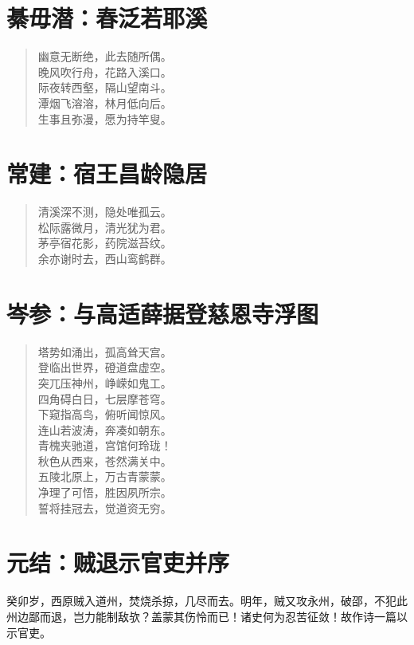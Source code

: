 \documentclass[12pt,oneside]{book}
\newenvironment{shici}{
\begin{verse}
\centering\large\hspace{12pt}}
{\end{verse}}
\begin{document}
\chapter{綦毋潜：春泛若耶溪}
\begin{shici}
幽意无断绝，此去随所偶。\\
晚风吹行舟，花路入溪口。\\
际夜转西壑，隔山望南斗。\\
潭烟飞溶溶，林月低向后。\\
生事且弥漫，愿为持竿叟。
\end{shici}

\chapter{常建：宿王昌龄隐居}
\begin{shici}
清溪深不测，隐处唯孤云。\\
松际露微月，清光犹为君。\\
茅亭宿花影，药院滋苔纹。\\
余亦谢时去，西山鸾鹤群。
\end{shici}

\chapter{岑参：与高适薛据登慈恩寺浮图}
\begin{shici}
塔势如涌出，孤高耸天宫。\\
登临出世界，磴道盘虚空。\\
突兀压神州，峥嵘如鬼工。\\
四角碍白日，七层摩苍穹。\\
下窥指高鸟，俯听闻惊风。\\
连山若波涛，奔凑如朝东。\\
青槐夹驰道，宫馆何玲珑！\\
秋色从西来，苍然满关中。\\
五陵北原上，万古青蒙蒙。\\
净理了可悟，胜因夙所宗。\\
誓将挂冠去，觉道资无穷。
\end{shici}

\chapter{元结：贼退示官吏并序}
癸卯岁，西原贼入道州，焚烧杀掠，几尽而去。明年，贼又攻永州，破邵，不犯此州边鄙而退，岂力能制敌欤？盖蒙其伤怜而已！诸史何为忍苦征敛！故作诗一篇以示官吏。
\end{document}
